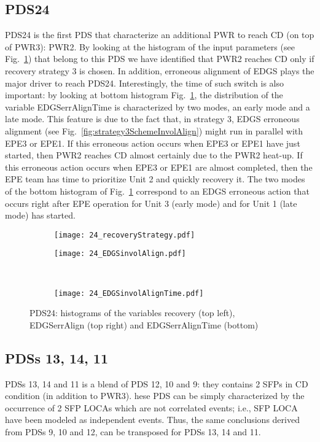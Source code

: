 \subsection{PDS24}
PDS24 is the first PDS that characterize an additional PWR to reach CD (on top of PWR3): PWR2. By looking at the
histogram of the input parameters (see Fig.~\ref{fig:histPDS_24}) that belong to this PDS we have identified 
that PWR2 reaches CD only if recovery strategy 3 is chosen. 
In addition, erroneous alignment of EDGS plays the major driver to reach PDS24. Interestingly, the time of such 
switch is also important: by looking at bottom histogram Fig.~\ref{fig:histPDS_24}, the distribution of the 
variable EDGSerrAlignTime is characterized by two modes, an early mode and a late mode.
This feature is due to the fact that, in strategy 3, EDGS erroneous alignment 
(see Fig.~\ref{fig:strategy3SchemeInvolAlign}) might run in parallel with EPE3 or EPE1.
If this erroneous action occurs when EPE3 or EPE1 have just started, then PWR2 reaches CD almost certainly due to
the PWR2 heat-up. If this erroneous action occurs when EPE3 or EPE1 are almost completed, then the EPE team
has time to prioritize Unit 2 and quickly recovery it.
The two modes of the bottom histogram of Fig.~\ref{fig:histPDS_24} correspond to an EDGS 
erroneous action that occurs right after EPE operation for Unit 3 (early mode) and for Unit 1 (late mode) has 
started.

\begin{figure}
  \begin{subfigure}{.5\linewidth}
    \centering
    \texttt{[image: 24\_recoveryStrategy.pdf]}
  \end{subfigure}%
  \begin{subfigure}{.5\linewidth}
    \centering
    \texttt{[image: 24\_EDGSinvolAlign.pdf]}
  \end{subfigure}\\[1ex]
  \begin{subfigure}{\linewidth}
    \centering
    \texttt{[image: 24\_EDGSinvolAlignTime.pdf]}
  \end{subfigure}
  \caption{PDS24: histograms of the variables recovery (top left), EDGSerrAlign (top right) and EDGSerrAlignTime (bottom)}
  \label{fig:histPDS_24}
\end{figure}

\subsection{PDSs 13, 14, 11}
PDSs 13, 14 and 11 is a blend of PDS 12, 10 and 9: they contains 2 SFPs in CD condition (in addition to PWR3). 
hese PDS can be simply characterized
by the occurrence of 2 SFP LOCAs which are not correlated events; i.e., SFP LOCA have been modeled as independent events.
Thus, the same conclusions derived from PDSs 9, 10 and 12, can be transposed for PDSs 13, 14 and 11.

